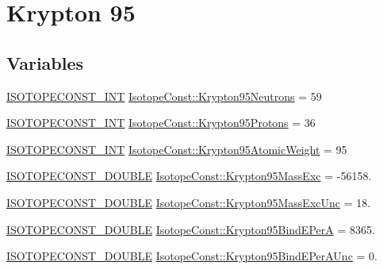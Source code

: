 \hypertarget{group___isotope_const-_krypton-_kr95}{}\section{Krypton 95}
\label{group___isotope_const-_krypton-_kr95}
\subsection*{Variables}
\begin{DoxyCompactItemize}
\item 
\mbox{\hyperlink{group___isotope_const-_macros_ga5f18360b3e99483a35c32d789e62621c}{I\+S\+O\+T\+O\+P\+E\+C\+O\+N\+S\+T\+\_\+\+I\+NT}} \mbox{\hyperlink{group___isotope_const-_krypton-_kr95_ga7bc9d51d6dbfda0298f3eca89c0c50d6}{Isotope\+Const\+::\+Krypton95\+Neutrons}} = 59
\item 
\mbox{\hyperlink{group___isotope_const-_macros_ga5f18360b3e99483a35c32d789e62621c}{I\+S\+O\+T\+O\+P\+E\+C\+O\+N\+S\+T\+\_\+\+I\+NT}} \mbox{\hyperlink{group___isotope_const-_krypton-_kr95_ga92a6bd1442970f1dbf518e0395bd6f24}{Isotope\+Const\+::\+Krypton95\+Protons}} = 36
\item 
\mbox{\hyperlink{group___isotope_const-_macros_ga5f18360b3e99483a35c32d789e62621c}{I\+S\+O\+T\+O\+P\+E\+C\+O\+N\+S\+T\+\_\+\+I\+NT}} \mbox{\hyperlink{group___isotope_const-_krypton-_kr95_gaf70ac086e14b5708aa0c9f77f8765c21}{Isotope\+Const\+::\+Krypton95\+Atomic\+Weight}} = 95
\item 
\mbox{\hyperlink{group___isotope_const-_macros_ga8f45a7272ce02c0b4c65c44636ed719a}{I\+S\+O\+T\+O\+P\+E\+C\+O\+N\+S\+T\+\_\+\+D\+O\+U\+B\+LE}} \mbox{\hyperlink{group___isotope_const-_krypton-_kr95_ga0709f1a1da68bf9edd46c00e0eb1c436}{Isotope\+Const\+::\+Krypton95\+Mass\+Exc}} = -\/56158.
\item 
\mbox{\hyperlink{group___isotope_const-_macros_ga8f45a7272ce02c0b4c65c44636ed719a}{I\+S\+O\+T\+O\+P\+E\+C\+O\+N\+S\+T\+\_\+\+D\+O\+U\+B\+LE}} \mbox{\hyperlink{group___isotope_const-_krypton-_kr95_gaaa625d951d827fc7cccc4445e2f81187}{Isotope\+Const\+::\+Krypton95\+Mass\+Exc\+Unc}} = 18.
\item 
\mbox{\hyperlink{group___isotope_const-_macros_ga8f45a7272ce02c0b4c65c44636ed719a}{I\+S\+O\+T\+O\+P\+E\+C\+O\+N\+S\+T\+\_\+\+D\+O\+U\+B\+LE}} \mbox{\hyperlink{group___isotope_const-_krypton-_kr95_ga7f94220e693cfc552cff26dcda7fd523}{Isotope\+Const\+::\+Krypton95\+Bind\+E\+PerA}} = 8365.
\item 
\mbox{\hyperlink{group___isotope_const-_macros_ga8f45a7272ce02c0b4c65c44636ed719a}{I\+S\+O\+T\+O\+P\+E\+C\+O\+N\+S\+T\+\_\+\+D\+O\+U\+B\+LE}} \mbox{\hyperlink{group___isotope_const-_krypton-_kr95_gaa31da8e1e523e48d3f139efcc064580b}{Isotope\+Const\+::\+Krypton95\+Bind\+E\+Per\+A\+Unc}} = 0.

\end{DoxyCompactItemize}
